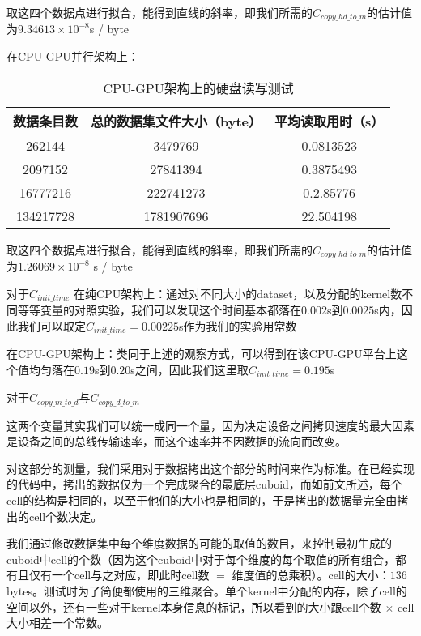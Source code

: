 取这四个数据点进行拟合，能得到直线的斜率，即我们所需的$C_{copy\_hd\_to\_m}$的估计值为$9.34613 \times 10^{-8}$s / byte

在CPU-GPU并行架构上：

\begin{table}[!htbp]
\centering
\caption{CPU-GPU架构上的硬盘读写测试} 
\label{tab:table2}
\begin{tabular}{|c|c|c|}
    \hline
    数据条目数 & 总的数据集文件大小（byte） & 平均读取用时（s）\\
    \hline
    262144 & 3479769 & 0.0813523\\
    \hline
    2097152 & 27841394 & 0.3875493\\
    \hline
    16777216 & 222741273 & 0.2.85776\\
    \hline
    134217728 & 1781907696 & 22.504198\\
    \hline
\end{tabular}
\end{table}

取这四个数据点进行拟合，能得到直线的斜率，即我们所需的$C_{copy\_hd\_to\_m}$的估计值为$1.26069 \times 10^{-8}$ s / byte

对于$C_{init\_time}$
在纯CPU架构上：通过对不同大小的dataset，以及分配的kernel数不同等等变量的对照实验，我们可以发现这个时间基本都落在$0.002$s到$0.0025$s内，因此我们可以取定$C_{init\_time} = 0.00225$s作为我们的实验用常数

在CPU-GPU架构上：类同于上述的观察方式，可以得到在该CPU-GPU平台上这个值均匀落在$0.19$s到$0.20$s之间，因此我们这里取$C_{init\_time} = 0.195$s

对于$C_{copy\_m\_to\_d}$与$C_{copy\_d\_to\_m}$

这两个变量其实我们可以统一成同一个量，因为决定设备之间拷贝速度的最大因素是设备之间的总线传输速率，而这个速率并不因数据的流向而改变。

对这部分的测量，我们采用对于数据拷出这个部分的时间来作为标准。在已经实现的代码中，拷出的数据仅为一个完成聚合的最底层cuboid，而如前文所述，每个cell的结构是相同的，以至于他们的大小也是相同的，于是拷出的数据量完全由拷出的cell个数决定。

我们通过修改数据集中每个维度数据的可能的取值的数目，来控制最初生成的cuboid中cell的个数（因为这个cuboid中对于每个维度的每个取值的所有组合，都有且仅有一个cell与之对应，即此时cell数 $=$ 维度值的总乘积）。cell的大小：$136$ bytes。测试时为了简便都使用的三维聚合。单个kernel中分配的内存，除了cell的空间以外，还有一些对于kernel本身信息的标记，所以看到的大小跟cell个数 $\times$ cell大小相差一个常数。

